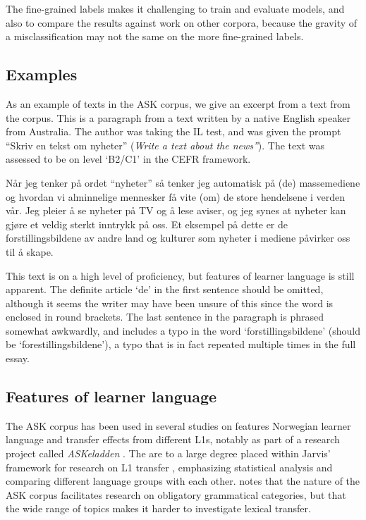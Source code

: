 The fine-grained labels makes it challenging to train and evaluate models,
and also to compare the results against work on other corpora, because the
gravity of a misclassification may not the same on the more fine-grained
labels.


\subsection{Examples}

As an example of texts in the ASK corpus, we give an excerpt from a text from
the corpus. This is a paragraph from a text written by a native English
speaker from Australia. The author was taking the IL test, and was given the
prompt ``Skriv en tekst om nyheter'' (\emph{Write a text about the news''}).
The text was assessed to be on level `B2/C1' in the CEFR framework.

\begin{displayquote}  %
  Når jeg tenker på ordet ``nyheter'' så tenker jeg automatisk på (de)
  massemediene og hvordan vi alminnelige mennesker få vite (om) de store
  hendelsene i verden vår. Jeg pleier å se nyheter på TV og å lese aviser, og
  jeg synes at nyheter kan gjøre et veldig sterkt inntrykk på oss. Et
  eksempel på dette er de forstillingsbildene av andre land og kulturer som
  nyheter i mediene påvirker oss til å skape.
\end{displayquote}

This text is on a high level of proficiency, but features of learner language
is still apparent. The definite article `de' in the first sentence should be
omitted, although it seems the writer may have been unsure of this since the
word is enclosed in round brackets. The last sentence in the paragraph is
phrased somewhat awkwardly, and includes a typo in the word
`forstillingsbildene' (should be `forestillingsbildene'), a typo that is in
fact repeated multiple times in the full essay.


\subsection{Features of learner language}

The ASK corpus has been used in several studies on features Norwegian learner
language and transfer effects from different \acp{L1}, notably as part of a
research project called \emph{ASKeladden} \autocite{goldentenfjord2015}. The
are to a large degree placed within Jarvis' framework for research on \ac{L1}
transfer \autocite{jarvis2000methodological}, emphasizing statistical
analysis and comparing different language groups with each other. \textcite{goldentenfjord2015}
notes that the nature of the ASK corpus facilitates research on obligatory
grammatical categories, but that the wide range of topics makes it harder to investigate
lexical transfer. 

